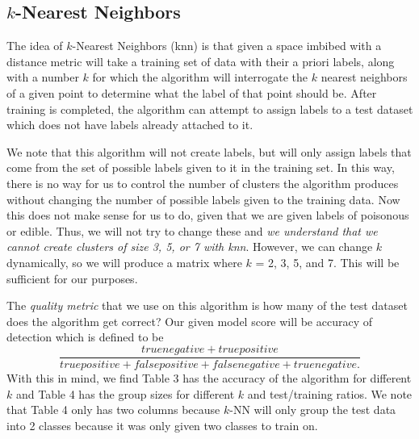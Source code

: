\documentclass{article}
\begin{document}
\subsection{$k$-Nearest Neighbors}

The idea of $k$-Nearest Neighbors (knn) is that given a space imbibed with a distance metric will take a training set of data with their a priori labels, along with a number $k$ for which the algorithm will interrogate the $k$ nearest neighbors of a given point to determine what the label of that point should be. After training is completed, the algorithm can attempt to assign labels to a test dataset which does not have labels already attached to it.

We note that this algorithm will not create labels, but will only assign labels that come from the set of possible labels given to it in the training set. In this way, there is no way for us to control the number of clusters the algorithm produces without changing the number of possible labels given to the training data. Now this does not make sense for us to do, given that we are given labels of poisonous or edible. Thus, we will not try to change these and \emph{we understand that we cannot create clusters of size 3, 5, or 7 with knn}. However, we can change $k$ dynamically, so we will produce a matrix where $k$ = 2, 3, 5, and 7. This will be sufficient for our purposes.

The \emph{quality metric} that we use on this algorithm is how many of the test dataset does the algorithm get correct? Our given model score will be accuracy of detection which is defined to be $$\frac{true negative + true positive}{true positive + false positive + false negative + true negative.}$$ With this in mind, we find Table 3 has the accuracy of the algorithm for different $k$ and Table 4 has the group sizes for different $k$ and test/training ratios. We note that Table 4 only has two columns because $k$-NN will only group the test data into 2 classes because it was only given two classes to train on. 
\end{document}
